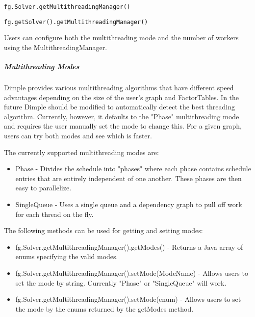 \ifmatlab
\begin{lstlisting}
fg.Solver.getMultithreadingManager()
\end{lstlisting}
\fi

\ifjava
\begin{lstlisting}
fg.getSolver().getMultithreadingManager()
\end{lstlisting}
\fi

Users can configure both the multithreading mode and the number of workers using the MultithreadingManager.

\subparagraph{Multithreading Modes}

Dimple provides various multithreading algorithms that have different speed advantages depending on the size of the user's graph and FactorTables.  In the future Dimple should be modified to automatically detect the best threading algorithm.  Currently, however, it defaults to the "Phase" multithreading mode and requires the user manually set the mode to change this.  For a given graph, users can try both modes and see which is faster.

The currently supported multithreading modes are:

\begin{itemize}
\item Phase - Divides the schedule into "phases" where each phase contains schedule entries that are entirely independent of one another.  These phases are then easy to parallelize.  
\item SingleQueue - Uses a single queue and a dependency graph to pull off work for each thread on the fly.  
\end{itemize}

The following methods can be used for getting and setting modes:


\ifmatlab

\begin{itemize}
\item fg.Solver.getMultithreadingManager().getModes() - Returns a Java array of enums specifying the valid modes.
\item fg.Solver.getMultithreadingManager().setMode(ModeName) - Allows users to set the mode by string.  Currently "Phase" or "SingleQueue" will work.
\item fg.Solver.getMultithreadingManager().setMode(enum) - Allows users to set the mode by the enums returned by the getModes method.
\end{itemize}

\fi


